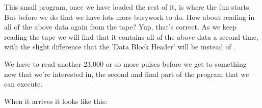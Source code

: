 This small program, once we have loaded the rest of it, is where the fun starts. But before we do that we have lots more
busywork to do. How about reading in all of the above data again from the tape? Yup, that's correct. As we keep
reading the tape we will find that it contains all of the above data a second time, with the slight difference that the 'Data
Block Header' will be  instead of .

We have to read another 23,000 or so more pulses before we get to something new that we're interested in, the second and final part of
the program that we can execute.

When it arrives it looks like this:

\begin{figure}[H]
  {
    \setlength{\tabcolsep}{3.0pt}
    \setlength\cmidrulewidth{\heavyrulewidth} %
    \begin{adjustbox}{width=10cm,center}
\end{adjustbox}}
\end{figure}

